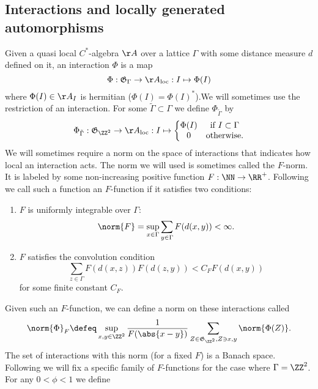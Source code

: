 \subsection{Interactions and locally generated automorphisms}
Given a quasi local $C^*$-algebra $\AA$ over a lattice $\Gamma$ with some distance measure $d$ defined on it, an interaction $\Phi$ is a map
\begin{equation}
	\Phi: \mathfrak{G}_{\Gamma}\rightarrow \AA_{\text{loc}}: I \mapsto \Phi(I)
\end{equation}
where $\Phi(I)\in\AA_I$ is hermitian ($\Phi(I)=\Phi(I)^*$).We will sometimes use the restriction of an interaction. For some $\tilde\Gamma\subset\Gamma$ we define $\Phi_{\tilde\Gamma}$ by
\begin{equation}
	\Phi_{\tilde\Gamma}:\mathfrak{G}_{\ZZ^2}\rightarrow \AA_{\text{loc}}:I\mapsto\left\{\begin{matrix}
		\Phi(I)&\text{if }I\subset\Gamma\\0&\text{otherwise}.
	\end{matrix}\right.
\end{equation}
We will sometimes require a norm on the space of interactions that indicates how local an interaction acts. The norm we will used is sometimes called the $F$-norm. It is labeled by some non-increasing positive function $F:\NN\rightarrow \RR^+$. Following \cite{nachtergaele2019quasi} we call such a function an $F$-function if it satisfies two conditions:
\begin{enumerate}
	\item $F$ is uniformly integrable over $\Gamma$:
	\begin{equation}\label{eq:F_Is_Uniformly_Integrable_Over_Gamma}
		\norm{F}=\sup_{x\in\Gamma}\sum_{y\in\Gamma}F(d(x,y))<\infty.
	\end{equation}
	\item $F$ satisfies the convolution condition
	\begin{equation}
		\sum_{z\in\Gamma}F(d(x,z))F(d(z,y))< C_F F(d(x,y))
	\end{equation}
	for some finite constant $C_F$.
\end{enumerate}
Given such an $F$-function, we can define a norm on these interactions called 
\begin{equation}
	\norm{\Phi}_F\defeq \sup_{x,y\in\ZZ^2}\frac{1}{F(\abs{x-y})}\sum_{Z\in\mathfrak{G}_{\ZZ^2},Z\ni x,y}\norm{\Phi(Z)}.
\end{equation}
The set of interactions with this norm (for a fixed $F$) is a Banach space. Following \cite{Ogata2d} we will fix a specific family of $F$-functions for the case where $\Gamma=\ZZ^2$. For any $0<\phi<1$ we define
